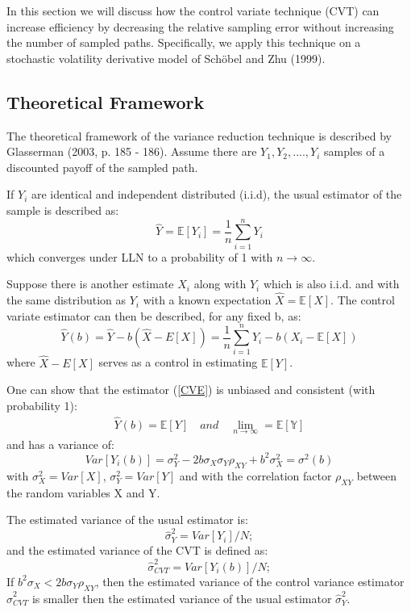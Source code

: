 \documentclass[a4paper,11pt]{article}
\begin{document}
In this section we will discuss how the control variate technique (CVT) can increase efficiency by decreasing the relative sampling error without increasing the number of sampled paths. Specifically, we apply this technique on a stochastic volatility derivative model of Sch\"obel and Zhu (1999).

\subsection{Theoretical Framework}
The theoretical framework of the variance reduction technique is described by Glasserman (2003, p. 185 - 186).
Assume there are $Y_1 , Y_2, ...., Y_i$ samples of a discounted payoff of the sampled path. 

If $Y_i$ are identical and independent distributed (i.i.d), the usual estimator of the sample is described as:
\begin{equation}
 \hat{Y}=\mathbb{E}[Y_i]=\frac{1}{n} \sum_{i=1}^n Y_i 
 \label{USUAL}
\end{equation}
which converges under LLN to a probability of 1 with $n \rightarrow \infty$.

Suppose there is another estimate $X_i$ along with $Y_i$ which is also i.i.d. and with the same distribution as $Y_i$ with a known expectation $\hat{X}=\mathbb{E}[X]$. The control variate estimator can then be described, for any fixed b, as:
\begin{equation}
\hat{Y}(b)= \hat{Y} - b(\hat{X} - E[X]) = \frac{1}{n} \sum_{i=1}^n Y_i - b(X_i - \mathbb{E}[X])
\label{CVE}
\end{equation}
where $ \hat{X} -E[X]$ serves as a control in estimating $\mathbb{E}[Y]$.

One can show that the estimator (\ref{CVE}) is unbiased and consistent (with probability 1):
\begin{eqnarray*}
\hat{Y}(b) = \mathbb{E}[Y] \quad and \quad \lim_{n \rightarrow \infty} = \mathbb{E[Y]} 
\end{eqnarray*}
and has a variance of:
\begin{equation*}
Var[Y_i (b)] = \sigma^2_Y - 2b\sigma_X \sigma_Y \rho_{XY} + b^2 \sigma^2 _X = \sigma^2(b)
\end{equation*}
with $\sigma^2_X = Var[X]$, $\sigma^2_Y = Var[Y]$ and with the correlation factor $\rho_{XY}$ between the random variables X and Y.

The estimated variance of the usual estimator is:
\begin{equation}
\hat{\sigma}_{Y}^2 = Var[Y_i]/N;
\end{equation}
and the estimated variance of the CVT is defined as:
\begin{equation}
\hat{\sigma}_{CVT}^2 = Var[Y_i(b)]/N;
\label{sigmaestb}
\end{equation}
If $b^2\sigma_X < 2b\sigma_Y \rho_{XY}$, then the estimated variance of the control variance estimator  $\hat{\sigma}_{CVT}^2 $ is smaller then the estimated variance of the usual estimator   $\hat{\sigma}_{Y}^2$. 
\end{document}
